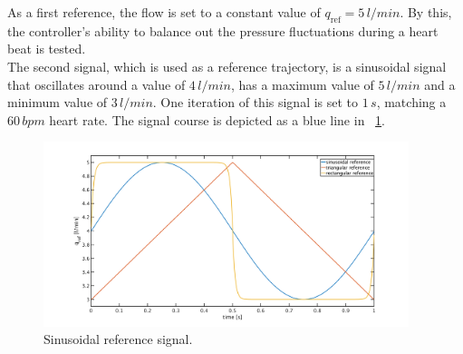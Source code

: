 As a first reference, the flow is set to a constant value of $q_{\mathrm{ref}}=5\,l/min$. By this, the controller's ability to balance out the pressure fluctuations during a heart beat is tested.
\\The second signal, which is used as a reference trajectory, is a sinusoidal signal that oscillates around a value of $4\, l/min$, has a maximum value of $5\, l/min$ and a minimum value of $3\, l/min$. One iteration of this signal is set to $1\,s$, matching a $60\,bpm$ heart rate. The signal course is depicted as a blue line in \figurename~\ref{fig:ref_all}.
\begin{figure}[!ht]
  \centering
  \includegraphics[width=0.95\textwidth]{images/chapt_5/ILC/ref_all.pdf}
  \caption[Sinusoidal reference signal]{Sinusoidal reference signal.}
  \label{fig:ref_all}
\end{figure}

